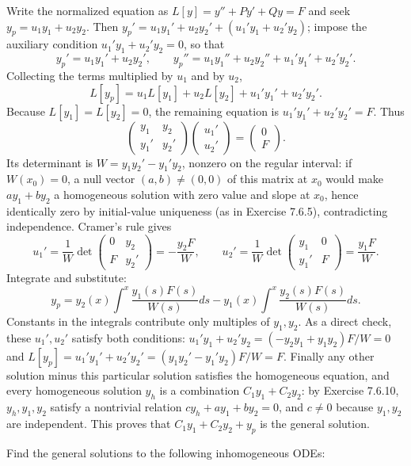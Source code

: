 \solution
{}
Write the normalized equation as $L[y]=y''+Py'+Qy=F$ and seek
$y_p=u_1y_1+u_2y_2$. Then
$y_p'=u_1y_1'+u_2y_2'+(u_1'y_1+u_2'y_2)$; impose the auxiliary condition
$u_1'y_1+u_2'y_2=0$, so that
\[
y_p'=u_1y_1'+u_2y_2',\qquad
y_p''=u_1y_1''+u_2y_2''+u_1'y_1'+u_2'y_2'.
\]
Collecting the terms multiplied by $u_1$ and by $u_2$,
\[
L[y_p]=u_1L[y_1]+u_2L[y_2]+u_1'y_1'+u_2'y_2'.
\]
Because $L[y_1]=L[y_2]=0$, the remaining equation is
$u_1'y_1'+u_2'y_2'=F$. Thus
\[
\begin{pmatrix}y_1&y_2\\y_1'&y_2'\end{pmatrix}
\begin{pmatrix}u_1'\\u_2'\end{pmatrix}
=\begin{pmatrix}0\\F\end{pmatrix}.
\]
Its determinant is $W=y_1y_2'-y_1'y_2$, nonzero on the regular interval:
if $W(x_0)=0$, a null vector $(a,b)\ne(0,0)$ of this matrix at $x_0$
would make $ay_1+by_2$ a homogeneous solution with zero value and slope
at $x_0$, hence identically zero by initial-value uniqueness (as in
Exercise 7.6.5), contradicting independence. Cramer's rule gives
\[
u_1'=\frac1W\det\begin{pmatrix}0&y_2\\F&y_2'\end{pmatrix}
=-\frac{y_2F}{W},\qquad
u_2'=\frac1W\det\begin{pmatrix}y_1&0\\y_1'&F\end{pmatrix}
=\frac{y_1F}{W}.
\]
Integrate and substitute:
\[
\boxed{y_p=y_2(x)\int^x\frac{y_1(s)F(s)}{W(s)}ds
-y_1(x)\int^x\frac{y_2(s)F(s)}{W(s)}ds}.
\]
Constants in the integrals contribute only multiples of $y_1,y_2$.
As a direct check, these $u_1',u_2'$ satisfy both conditions:
$u_1'y_1+u_2'y_2=(-y_2y_1+y_1y_2)F/W=0$ and
$L[y_p]=u_1'y_1'+u_2'y_2'=(y_1y_2'-y_1'y_2)F/W=F$.
Finally any other solution minus this particular solution satisfies the
homogeneous equation, and every homogeneous solution $y_h$ is a
combination $C_1y_1+C_2y_2$: by Exercise 7.6.10, $y_h,y_1,y_2$ satisfy
a nontrivial relation $cy_h+ay_1+by_2=0$, and $c\ne0$ because $y_1,y_2$
are independent. This proves that $C_1y_1+C_2y_2+y_p$ is the general
solution.

\bigskip
Find the general solutions to the following inhomogeneous ODEs:

